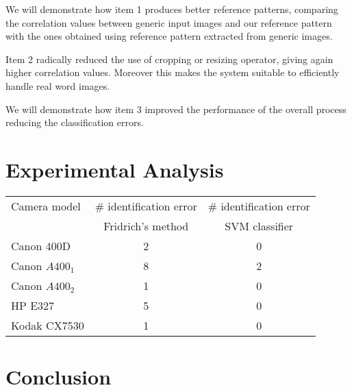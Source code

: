 \documentclass[runningheads,11pt]{llncs}
\begin{document}
We will demonstrate how item 1 produces better reference patterns,
comparing the correlation values between generic input images and
our reference pattern with the ones obtained using reference pattern
extracted from generic images.

Item 2 radically reduced the use of cropping or resizing operator,
giving again higher correlation values. Moreover this makes the
system suitable to efficiently handle real word images.

We will demonstrate how item 3 improved the performance of the
overall process reducing the classification errors.


\section{Experimental Analysis}
\label{sec:experiments}

\begin{tabular}{|l|c|c|}
  \hline
  Camera model & \# identification error & \# identification  error \\
               & Fridrich's method    & SVM classifier \\
  \hline
  Canon 400D  & 2 & 0 \\
  Canon $ A400_1 $ & 8 & 2 \\
  Canon $ A400_2 $ & 1 & 0 \\
  HP E327 & 5 & 0 \\
  Kodak CX7530  & 1 & 0 \\
  \hline
\end{tabular}
\section{Conclusion}





\end{document}
